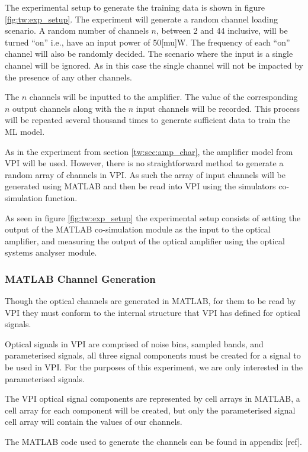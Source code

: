 The experimental setup to generate the training data is shown in figure \ref{fig:tw:exp_setup}. The experiment will generate a random channel loading scenario. A random number of channels $n$, between 2 and 44 inclusive, will be turned “on” i.e., have an input power of 50[mu]W. The frequency of each “on” channel will also be randomly decided. The scenario where the input is a single channel will be ignored. As in this case the single channel will not be impacted by the presence of any other channels.

The $n$ channels will be inputted to the amplifier. The value of the corresponding $n$ output channels along with the $n$ input channels will be recorded. This process will be repeated several thousand times to generate sufficient data to train the ML model. 

As in the experiment from section \ref{tw:sec:amp_char}, the amplifier model from VPI will be used. However, there is no straightforward method to generate a random array of channels in VPI. As such the array of input channels will be generated using MATLAB and then be read into VPI using the simulators co-simulation function.

As seen in figure \ref{fig:tw:exp_setup} the experimental setup consists of setting the output of the MATLAB co-simulation module as the input to the optical amplifier, and measuring the output of the optical amplifier using the optical systems analyser module. 


\subsubsection{MATLAB Channel Generation}

Though the optical channels are generated in MATLAB, for them to be read by VPI they must conform to the internal structure that VPI has defined for optical signals. 

Optical signals in VPI are comprised of noise bins, sampled bands, and parameterised signals, all three signal components must be created for a signal to be used in VPI. 
For the purposes of this experiment, we are only interested in the parameterised signals.

The VPI optical signal components are represented by cell arrays in MATLAB, a cell array for each component will be created, but only the parameterised signal cell array will contain the values of our channels.  

The MATLAB code used to generate the channels can be found in appendix [ref].

